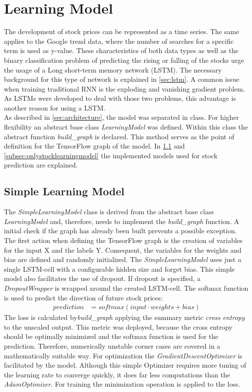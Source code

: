 \section{Learning Model}
\label{sec:model}
The development of stock prices can be represented as a time series. The same applies to the Google trend data, where the number of searches for a specific term is used as y-value. These characteristics of both data types as well as the binary classification problem of predicting the rising or falling of the stocks urge the usage of a Long short-term memory network (LSTM). The necessary background for this type of network is explained in \ref{sec:lstm}. A common issue when training traditional RNN is the exploding and vanishing gradient problem. As LSTMs were developed to deal with those two problems, this advantage is another reason for using a LSTM. 
\\
As described in \ref{sec:architecture}, the model was separated in class. For higher flexibility an abstract base class \textit{LearningModel} was defined. Within this class the abstract function \textit{build\_graph} is declared. This method serves as the point of definition for the TensorFlow graph of the model. In \ref{subsec:simplelearningmodel} and \ref{subsec:onlystocklearningmodel} the implemented models used for stock prediction are explained. 

\subsection{Simple Learning Model}
\label{subsec:simplelearningmodel}
The \textit{SimpleLearningModel} class is derived from the abstract base class \textit{LearningModel} and, therefore, needs to implement the \textit{build\_graph} function. A initial check if the graph has already been built prevents a possible exception. The first action when defining the TensorFlow graph is the creation of variables for the input X and the labels Y. Consequent, the variables for the weights and bias are defined and randomly initialized. The \textit{SimpleLearningModel} uses just a single LSTM-cell with a configurable hidden size and forget bias. This simple model also facilitates the use of dropout. If dropout is specified, a \textit{DropoutWrapper} is wrapped around the created LSTM-cell. The softmax function is used to predict the direction of future stock prices:
\begin{align}
prediction &= softmax(input \cdot weights + bias)
\end{align}
The loss is calculated by\textit{build\_graph} applying the summary metric \textit{cross entropy} to the unscaled output. This metric was deployed, because the cross entropy should be optimally minimized and the softmax function is used for the prediction. Therefore, numerically unstable corner cases are covered in a mathematically suitable way. For optimization the \textit{GradientDescentOptimizer} is facilitated by the model. Although this simple Optimizer requires more tuning of the learning rate to converge quickly, it does far less computations than the \textit{AdamOptimizer}. For training the minimization operation is applied to the loss. 

